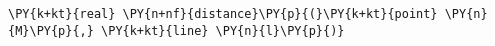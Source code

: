 \begin{Verbatim}[commandchars=\\\{\}]
    \PY{k+kt}{real} \PY{n+nf}{distance}\PY{p}{(}\PY{k+kt}{point} \PY{n}{M}\PY{p}{,} \PY{k+kt}{line} \PY{n}{l}\PY{p}{)}
\end{Verbatim}
